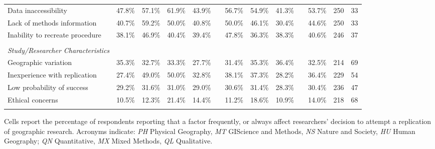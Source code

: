 \documentclass[]{interact}
\theoremstyle{plain}%
\theoremstyle{definition}
\theoremstyle{remark}
\begin{document}
\begin{landscape}
\begin{table}[h]
\begin{threeparttable}
\begin{tabular}{l c c c c c c c c c c c c}
         Data inaccessibility               & 47.8\% & 57.1\% & 61.9\% & 43.9\% & & 56.7\% & 54.9\% & 41.3\% & & 53.7\% & 250 & 33 \\
         Lack of methods information        & 40.7\% & 59.2\% & 50.0\% & 40.8\% & & 50.0\% & 46.1\% & 30.4\% & & 44.6\% & 250 & 33 \\
         Inability to recreate procedure    & 38.1\% & 46.9\% & 40.4\% & 39.4\% & & 47.8\% & 36.3\% & 38.3\% & & 40.6\% & 246 & 37 \\
                                            & & & & & & & & & & & & \\
         \textit{Study/Researcher Characteristics}     & & & & & & & & & & & & \\
         Geographic variation               & 35.3\% & 32.7\% & 33.3\% & 27.7\% & & 31.4\% & 35.3\% & 36.4\% & & 32.5\% & 214 & 69 \\
         Inexperience with replication      & 27.4\% & 49.0\% & 50.0\% & 32.8\% & & 38.1\% & 37.3\% & 28.2\% & & 36.4\% & 229 & 54 \\
         Low probability of success         & 29.2\% & 31.6\% & 31.0\% & 29.0\% & & 30.6\% & 31.4\% & 28.3\% & & 30.4\% & 236 & 47 \\
         Ethical concerns                   & 10.5\% & 12.3\% & 21.4\% & 14.4\% & & 11.2\% & 18.6\% & 10.9\% & & 14.0\% & 218 & 68 \\
                                            & & & & & & & & & & & & \\
        \hline
    \end{tabular}
    \begin{tablenotes}
        \footnotesize
        \item Cells report the percentage of respondents reporting that a factor frequently, or always affect researchers' decision to attempt a replication of geographic research. Acronyms indicate: \textit{PH} Physical Geography, \textit{MT} GIScience and Methods, \textit{NS} Nature and Society, \textit{HU} Human Geography; \textit{QN} Quantitative, \textit{MX} Mixed Methods, \textit{QL} Qualitative. 
    \end{tablenotes}
    \label{tab:motivations}
    \end{threeparttable}
\end{table}
\end{landscape}

\newpage
\end{document}
